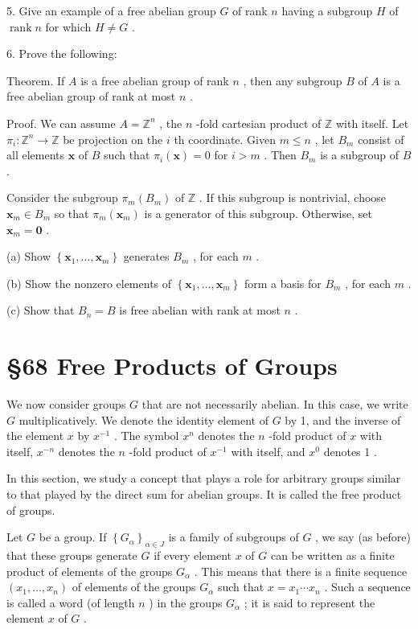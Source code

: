 5. Give an example of a free abelian group \(G\) of rank \(n\) having a subgroup \(H\) of \(\operatorname{rank}n\) for which \(H \neq  G\) .

6. Prove the following:

Theorem. If \(A\) is a free abelian group of rank \(n\) , then any subgroup \(B\) of \(A\) is a free abelian group of rank at most \(n\) .

Proof. We can assume \(A = {\mathbb{Z}}^{n}\) , the \(n\) -fold cartesian product of \(\mathbb{Z}\) with itself. Let \({\pi }_{i} : {\mathbb{Z}}^{n} \rightarrow  \mathbb{Z}\) be projection on the \(i\) th coordinate. Given \(m \leq  n\) , let \({B}_{m}\) consist of all elements \(\mathbf{x}\) of \(B\) such that \({\pi }_{i}\left( \mathbf{x}\right)  = 0\) for \(i > m\) . Then \({B}_{m}\) is a subgroup of \(B\) .

Consider the subgroup \({\pi }_{m}\left( {B}_{m}\right)\) of \(\mathbb{Z}\) . If this subgroup is nontrivial, choose \({\mathbf{x}}_{m} \in  {B}_{m}\) so that \({\pi }_{m}\left( {\mathbf{x}}_{m}\right)\) is a generator of this subgroup. Otherwise, set \({\mathbf{x}}_{m} = \mathbf{0}\) .

(a) Show \(\left\{  {{\mathbf{x}}_{1},\ldots ,{\mathbf{x}}_{m}}\right\}\) generates \({B}_{m}\) , for each \(m\) .

(b) Show the nonzero elements of \(\left\{  {{\mathbf{x}}_{1},\ldots ,{\mathbf{x}}_{m}}\right\}\) form a basis for \({B}_{m}\) , for each \(m\) .

(c) Show that \({B}_{n} = B\) is free abelian with rank at most \(n\) .

\section*{ \S 68 Free Products of Groups}

We now consider groups \(G\) that are not necessarily abelian. In this case, we write \(G\) multiplicatively. We denote the identity element of \(G\) by 1, and the inverse of the element \(x\) by \({x}^{-1}\) . The symbol \({x}^{n}\) denotes the \(n\) -fold product of \(x\) with itself, \({x}^{-n}\) denotes the \(n\) -fold product of \({x}^{-1}\) with itself, and \({x}^{0}\) denotes 1 .

In this section, we study a concept that plays a role for arbitrary groups similar to that played by the direct sum for abelian groups. It is called the free product of groups.

Let \(G\) be a group. If \({\left\{  {G}_{\alpha }\right\}  }_{\alpha  \in  J}\) is a family of subgroups of \(G\) , we say (as before) that these groups generate \(G\) if every element \(x\) of \(G\) can be written as a finite product of elements of the groups \({G}_{\alpha }\) . This means that there is a finite sequence \(\left( {{x}_{1},\ldots ,{x}_{n}}\right)\) of elements of the groups \({G}_{\alpha }\) such that \(x = {x}_{1}\cdots {x}_{n}\) . Such a sequence is called a word (of length \(n\) ) in the groups \({G}_{\alpha }\) ; it is said to represent the element \(x\) of \(G\) .

